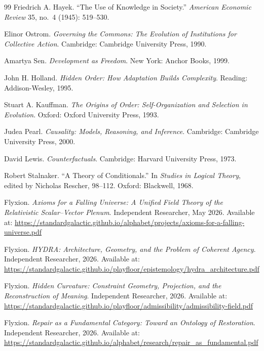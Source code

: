 \documentclass[12pt, a4paper]{article}
\theoremstyle{plain}
\theoremstyle{definition}
\theoremstyle{remark}
\begin{document}
\begin{thebibliography}{99}
Friedrich A. Hayek. ``The Use of Knowledge in
Society.'' \textit{American Economic Review}
35, no.~4 (1945): 519--530.

Elinor Ostrom. \textit{Governing the Commons:
The Evolution of Institutions for Collective
Action}. Cambridge: Cambridge University Press,
1990.

Amartya Sen. \textit{Development as Freedom}.
New York: Anchor Books, 1999.

John H. Holland. \textit{Hidden Order: How
Adaptation Builds Complexity}. Reading:
Addison-Wesley, 1995.

Stuart A. Kauffman. \textit{The Origins of
Order: Self-Organization and Selection in
Evolution}. Oxford: Oxford University Press,
1993.

Judea Pearl. \textit{Causality: Models,
Reasoning, and Inference}. Cambridge: Cambridge
University Press, 2000.

David Lewis. \textit{Counterfactuals}.
Cambridge: Harvard University Press, 1973.

Robert Stalnaker. ``A Theory of Conditionals.''
In \textit{Studies in Logical Theory}, edited
by Nicholas Rescher, 98--112. Oxford: Blackwell,
1968.

Flyxion. \textit{Axioms for a Falling Universe:
A Unified Field Theory of the Relativistic
Scalar--Vector Plenum}. Independent Researcher,
May 2026. Available at:
\url{https://standardgalactic.github.io/alphabet/projects/axioms-for-a-falling-universe.pdf}

Flyxion. \textit{HYDRA: Architecture, Geometry,
and the Problem of Coherent Agency}. Independent
Researcher, 2026. Available at:
\url{https://standardgalactic.github.io/playfloor/epistemology/hydra_architecture.pdf}

Flyxion. \textit{Hidden Curvature: Constraint
Geometry, Projection, and the Reconstruction
of Meaning}. Independent Researcher, 2026.
Available at:
\url{https://standardgalactic.github.io/playfloor/admissibility/admissibility-field.pdf}

Flyxion. \textit{Repair as a Fundamental
Category: Toward an Ontology of Restoration}.
Independent Researcher, 2026. Available at:
\url{https://standardgalactic.github.io/alphabet/research/repair_as_fundamental.pdf}

\end{thebibliography}
\end{document}
